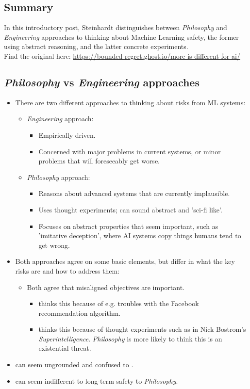 \documentclass{article}
\begin{document}
\begin{multicols}{2}
\subsection*{Summary}
In this introductory post, Steinhardt distinguishes between \textit{Philosophy} and \textit{Engineering} approaches to thinking about Machine Learning safety, the former using abstract reasoning, and the latter concrete experiments.\\
Find the original here: \href{https://bounded-regret.ghost.io/more-is-different-for-ai/}{https://bounded-regret.ghost.io/more-is-different-for-ai/}

\subsection*{\textit{Philosophy} vs \textit{Engineering} approaches}
\begin{itemize}
\item There are two different approaches to thinking about risks from ML systems:
\begin{itemize}
\item \textit{Engineering} approach:
\begin{itemize}
\item Empirically driven.
\item Concerned with major problems in current systems, or minor problems that will foreseeably get worse.
\end{itemize}
\item \textit{Philosophy} approach:
\begin{itemize}
\item Reasons about advanced systems that are currently implausible.
\item Uses thought experiments; can sound abstract and 'sci-fi like'.
\item Focuses on abstract properties that seem important, such as 'imitative deception', where AI systems copy things humans tend to get wrong.
\end{itemize}
\end{itemize}
\item Both approaches agree on some basic elements, but differ in what the key risks are and how to address them:
\begin{itemize}
\item Both agree that misaligned objectives are important.
\begin{itemize}
\item {} thinks this because of e.g. troubles with the Facebook recommendation algorithm.
\item {} thinks this because of thought experiments such as in Nick Bostrom's \textit{Superintelligence}. \emph{Philosophy} is more likely to think this is an existential threat.
\end{itemize}
\end{itemize}
\item {} can seem ungrounded and confused to .
\item {} can seem indifferent to long-term safety to \emph{Philosophy}.
\end{itemize}

\end{multicols}
\end{document}
